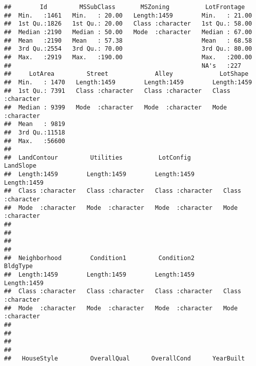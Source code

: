 \documentclass[
]{article}
\begin{document}
\begin{verbatim}
##        Id         MSSubClass       MSZoning          LotFrontage    
##  Min.   :1461   Min.   : 20.00   Length:1459        Min.   : 21.00  
##  1st Qu.:1826   1st Qu.: 20.00   Class :character   1st Qu.: 58.00  
##  Median :2190   Median : 50.00   Mode  :character   Median : 67.00  
##  Mean   :2190   Mean   : 57.38                      Mean   : 68.58  
##  3rd Qu.:2554   3rd Qu.: 70.00                      3rd Qu.: 80.00  
##  Max.   :2919   Max.   :190.00                      Max.   :200.00  
##                                                     NA's   :227     
##     LotArea         Street             Alley             LotShape        
##  Min.   : 1470   Length:1459        Length:1459        Length:1459       
##  1st Qu.: 7391   Class :character   Class :character   Class :character  
##  Median : 9399   Mode  :character   Mode  :character   Mode  :character  
##  Mean   : 9819                                                           
##  3rd Qu.:11518                                                           
##  Max.   :56600                                                           
##                                                                          
##  LandContour         Utilities          LotConfig          LandSlope        
##  Length:1459        Length:1459        Length:1459        Length:1459       
##  Class :character   Class :character   Class :character   Class :character  
##  Mode  :character   Mode  :character   Mode  :character   Mode  :character  
##                                                                             
##                                                                             
##                                                                             
##                                                                             
##  Neighborhood        Condition1         Condition2          BldgType        
##  Length:1459        Length:1459        Length:1459        Length:1459       
##  Class :character   Class :character   Class :character   Class :character  
##  Mode  :character   Mode  :character   Mode  :character   Mode  :character  
##                                                                             
##                                                                             
##                                                                             
##                                                                             
##   HouseStyle         OverallQual      OverallCond      YearBuilt   

\end{verbatim}
\end{document}
